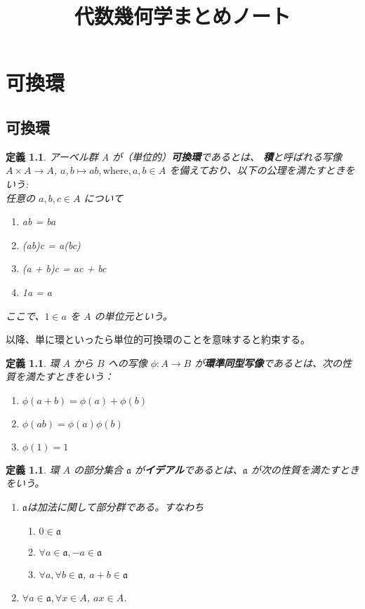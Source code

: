\documentclass[uplatex, 12pt, dvipdfmx]{jsreport}
\title{代数幾何学まとめノート}
\date{}
\newtheorem{dfn}[thm]{定義}
\newcommand{\mfa}{\mathfrak{a}}
\begin{document}
\maketitle

\chapter{可換環}

\section{可換環}
\begin{dfn}
アーベル群 A が（単位的）\textbf{可換環}であるとは、
\textbf{積}と呼ばれる写像 $A \times A \to A$, $a, b \mapsto ab, \text{where}, a, b \in A$
を備えており、以下の公理を満たすときをいう: \\

任意の $a, b, c \in A$ について
\begin{enumerate}
    \item ab = ba
    \item (ab)c = a(bc)
    \item (a + b)c = ac + bc
    \item 1a = a
\end{enumerate}
ここで、$1 \in a$ を $A$ の単位元という。
\end{dfn}
以降、単に環といったら単位的可換環のことを意味すると約束する。

\begin{dfn}
    環 $A$ から $B$ への写像 $\phi: A \to B$ が\textbf{環準同型写像}であるとは、次の性質を満たすときをいう：
    \begin{enumerate}
        \item $\phi(a + b) = \phi(a) + \phi(b)$
        \item $\phi(ab) = \phi(a)\phi(b)$
        \item $\phi(1) = 1$
    \end{enumerate}
\end{dfn}

\begin{dfn}
    環 $A$ の部分集合 $\mfa$ が\textbf{イデアル}であるとは、$\mfa$ が次の性質を満たすときをいう。
    \begin{enumerate}
        \item $\mfa$は加法に関して部分群である。すなわち
        \begin{enumerate}
            \item $0 \in \mfa$
            \item $\forall a \in \mfa, -a \in \mfa$
            \item $\forall a, \forall b \in \mfa$, $a + b \in \mfa$
        \end{enumerate}
        \item $\forall a \in \mfa, \forall x \in A$, $ax \in A$.
    \end{enumerate}
\end{dfn}
\end{document}
